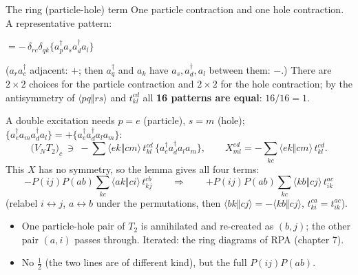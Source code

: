 \documentclass[aspectratio=169,10pt]{beamer}
\newcommand{\cre}[1]{a_{#1}^{\dagger}}
\newcommand{\ann}[1]{a_{#1}}
\newcommand{\no}[1]{\bigl\{#1\bigr\}}
\newcommand{\as}[4]{\langle #1#2\Vert #3#4\rangle}
\begin{document}
\begin{frame}[shrink=16]{The ring (particle-hole) term}
\small
One particle contraction and one hole contraction. A representative pattern:
\begin{center}
$=-\,\delta_{rc}\delta_{qk}\no{\cre p\ann s\cre d\ann l}$
\end{center}
($\ann r\cre c$ adjacent: $+$; then $\cre q$ and $\ann k$ have $\ann s,\cre d,\ann l$ between them: $-$.) There are $2\times2$ choices for the particle contraction and $2\times2$ for the hole contraction; by the antisymmetry of $\as pqrs$ and $t_{kl}^{cd}$ all \textbf{16 patterns are equal}: $16/16=1$.

A double excitation needs $p=e$ (particle), $s=m$ (hole); $\no{\cre e\ann m\cre d\ann l}=+\no{\cre e\cre d\ann l\ann m}$:
\[
 \bigl(V_NT_2\bigr)_c\ \ni\ -\sum\as ekcm\,t_{kl}^{cd}\,\no{\cre e\cre d\ann l\ann m},
 \qquad X_{ml}^{ed}=-\sum_{kc}\as ekcm\,t_{kl}^{cd}.
\]
This $X$ has no symmetry, so the lemma gives all four terms:
\[
 -P(ij)P(ab)\sum_{kc}\as akci\,t_{kj}^{cb}
 \qquad\Longrightarrow\qquad
 \boxed{+P(ij)P(ab)\sum_{kc}\as kbcj\,t_{ik}^{ac}}
\]
(relabel $i\leftrightarrow j$, $a\leftrightarrow b$ under the permutations, then $\as bkcj=-\as kbcj$, $t_{ki}^{ca}=t_{ik}^{ac}$).
\begin{itemize}
\item One particle-hole pair of $T_2$ is annihilated and re-created as $(b,j)$; the other pair $(a,i)$ passes through. Iterated: the ring diagrams of RPA (chapter 7).
\item No $\tfrac12$ (the two lines are of different kind), but the full $P(ij)P(ab)$.
\end{itemize}
\end{frame}
\end{document}
